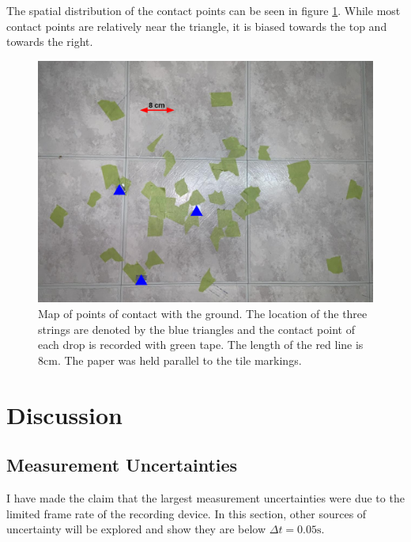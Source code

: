 \documentclass[%
 reprint,
 amsmath,amssymb,
 aps,
]{revtex4-2}
\begin{document}
The spatial distribution of the contact points can be seen in figure \ref{fig:scatter}. While most contact points are relatively near the triangle, it is biased towards the top and towards the right. 
\begin{figure}[!h]
    \includegraphics[width=\linewidth]{scatter.png}
    \caption{Map of points of contact with the ground. The location of the three strings are denoted by the blue triangles and the contact point of each drop is recorded with green tape. The length of the red line is $8\si{\centi\metre}$. The paper was held parallel to the tile markings.}
    \label{fig:scatter}
\end{figure}
\section{Discussion}
\subsection{Measurement Uncertainties}
I have made the claim that the largest measurement uncertainties were due to the limited frame rate of the recording device. In this section, other sources of uncertainty will be explored and show they are below $\Delta t = 0.05 \si{\second}$.
\end{document}
